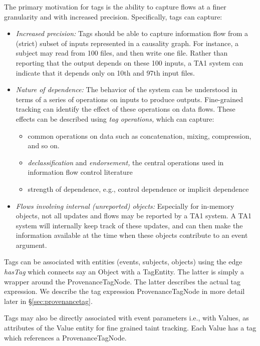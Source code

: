 \documentclass[10pt, conference, onecolumn]{IEEEtran}
\begin{document}
The primary motivation for tags is the ability to capture flows at a finer granularity and with increased precision. Specifically, tags can capture:
\begin{itemize}
\item {\em Increased precision:} Tags should be able to capture information flow  from a (strict) subset of inputs represented in a causality graph. For instance, a subject may read from 100 files, and then write one file. Rather than reporting that the output depends on these 100 inputs, a TA1 system can indicate that it depends only on 10th and 97th input files.
%
\item {\em Nature of dependence:} The behavior of the system can be understood in terms of a series of operations on inputs to produce outputs. Fine-grained tracking can identify the effect of these operations on data  flows. These effects can be described using {\em tag operations,} which can capture:
  \begin{itemize}
    \item common operations on data such as concatenation, mixing, compression, and so on.
    \item {\em declassification} and {\em endorsement,} the central operations used in information flow control literature
    \item strength of dependence, e.g., control dependence or implicit dependence
  \end{itemize}
%
\item {\em Flows involving internal (unreported) objects:} Especially for in-memory objects, not all updates and flows may be reported by a TA1 system. A TA1 system will internally keep track of these updates, and can then make the information available at the time when these objects contribute to an event argument.
%
\end{itemize}


Tags can be associated with entities (events, subjects, objects) using the edge \textit{hasTag} which connects say an Object with a TagEntity. 
The latter is simply a wrapper around the ProvenanceTagNode. The latter describes the actual tag expression. 
We describe the tag expression ProvenanceTagNode in more detail later in \S \ref{sec:provenancetag}.

Tags may also be directly associated with event parameters i.e., with Values, as attributes of the Value entity for fine grained taint tracking. 
Each Value has a tag which references a ProvenanceTagNode.
\end{document}
